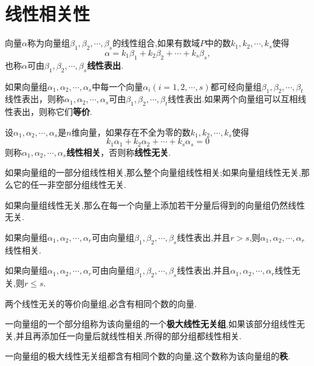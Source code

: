 \section{线性相关性}
\begin{definition}
    向量$\alpha$称为向量组$\beta_1, \beta_2, \cdots, \beta_s$的线性组合,如果有数域$P$中的数$k_1, k_2, \cdots, k_s$使得
    \begin{equation*}
        \alpha = k_1\beta_1 + k_2\beta_2 + \cdots + k_s\beta_s,
    \end{equation*}
    也称$\alpha$可由$\beta_1, \beta_2, \cdots, \beta_s$\textbf{线性表出}.
\end{definition}
\begin{definition}
    如果向量组$\alpha_1,\alpha_2,\cdots,\alpha_s$中每一个向量$\alpha_i(i=1,2,\cdots,s)$都可经向量组$\beta_1, \beta_2, \cdots, \beta_t$线性表出，则称$\alpha_1,\alpha_2,\cdots,\alpha_s$可由$\beta_1, \beta_2, \cdots, \beta_t$线性表出.如果两个向量组可以互相线性表出，则称它们\textbf{等价}.
\end{definition}
\begin{definition}
    设$\alpha_1, \alpha_2, \cdots, \alpha_s$是$n$维向量，如果存在不全为零的数$k_1, k_2, \cdots, k_s$使得
    \begin{equation*}
        k_1\alpha_1 + k_2\alpha_2 + \cdots + k_s\alpha_s = 0
    \end{equation*}
    则称$\alpha_1, \alpha_2, \cdots, \alpha_s$\textbf{线性相关}，否则称\textbf{线性无关}.
\end{definition}
\begin{theorem}
    如果向量组的一部分组线性相关,那么整个向量组线性相关;如果向量组线性无关,那么它的任一非空部分组线性无关.
\end{theorem}
\begin{theorem}
    如果向量组线性无关,那么在每一个向量上添加若干分量后得到的向量组仍然线性无关.
\end{theorem}
\begin{theorem}
    如果向量组$\alpha_1,\alpha_2,\cdots,\alpha_r$可由向量组$\beta_1, \beta_2, \cdots, \beta_s$线性表出,并且$r>s$,则$\alpha_1,\alpha_2,\cdots,\alpha_r$线性相关.
\end{theorem}
\begin{theorem}
    如果向量组$\alpha_1,\alpha_2,\cdots,\alpha_r$可由向量组$\beta_1, \beta_2, \cdots, \beta_s$线性表出,并且$\alpha_1,\alpha_2,\cdots,\alpha_r$线性无关,则$r \leq s$.
\end{theorem}
\begin{theorem}
    两个线性无关的等价向量组,必含有相同个数的向量.
\end{theorem}
\begin{definition}
    一向量组的一个部分组称为该向量组的一个\textbf{极大线性无关组},如果该部分组线性无关,并且再添加任一向量后就线性相关,所得的部分组都线性相关.
\end{definition}
\begin{theorem}
    一向量组的极大线性无关组都含有相同个数的向量,这个数称为该向量组的\textbf{秩}.
\end{theorem}

